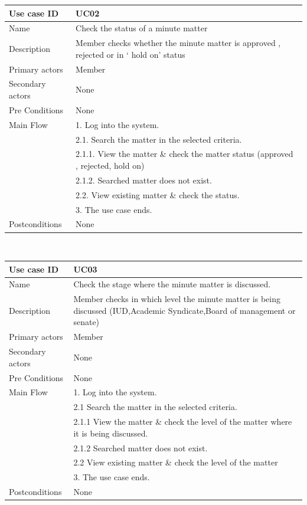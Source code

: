 \documentclass[a4paper,beamer]{article}
\begin{document}
			\begin{tabular}{|p{4cm}|p{8cm}|} \hline 
					\textbf{Use case ID} & \textbf{UC02}  \\ \hline
					Name & Check the status of a minute matter \\ \hline 
					Description & Member checks whether the minute matter is approved  , rejected or in ‘ hold on’ status \\ \hline 
					Primary actors & Member \\ \hline 
					Secondary actors & None \\ \hline 
					Pre Conditions & None \\ \hline 
					Main Flow & 1. Log into the system. \\
										&	2.1. Search the matter in the selected criteria. \\
										&	2.1.1. View the matter \& check the matter status (approved , rejected, hold on) \\
										&	2.1.2. Searched matter does not exist.\\ 
										&	2.2. View existing matter \& check the status.  \\
										&	3. The use case ends.\\ \hline		
					Postconditions & None \\ \hline 
			\end{tabular} \\[.6cm]
			
			\begin{tabular}{|p{4cm}|p{8cm}|} \hline 
					\textbf{Use case ID} & \textbf{UC03}  \\ \hline
					Name & Check the stage where the minute matter is discussed. \\ \hline 
					Description & Member checks in which level the minute matter is being discussed (IUD,Academic Syndicate,Board of management or senate) \\ \hline 
					Primary actors & Member \\ \hline 
					Secondary actors & None \\ \hline 
					Pre Conditions & None \\ \hline
					Main Flow & 1. Log into the system. \\
										& 2.1 Search the matter in the selected criteria.\\
										& 2.1.1 View the matter \& check the level of the matter where it is being discussed. \\
										& 2.1.2 Searched matter does not exist. \\
										& 2.2 View existing matter \& check the level of the matter\\
										& 3. The use case ends.\\ \hline
					Postconditions & None \\ \hline 
			\end{tabular} \\[.6cm]
				
\end{document}
